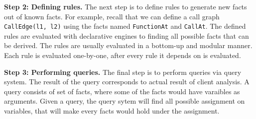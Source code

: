 \textbf{Step 2: Defining rules.}
The next step is to define rules to generate new facts out of known facts.
For example, recall that we can define a call graph
{\tt CallEdge(l1, l2)} using the facts
named {\tt FunctionAt} and {\tt CallAt}.
The defined rules are evaluated with declarative engines to finding all possible
facts that can be derived. The rules are usually evaluated in a bottom-up
and modular manner. Each rule is evaluated one-by-one, after every
rule it depends on is evaluated. 

\textbf{Step 3: Performing queries.}
The final step is to perform queries via query system.
The result of the query corresponds to actual result of client analysis.
A query consists of set of facts, where some of the facts would have
varaibles as arguments. Given a query, the query sytem will find all possible
assignment on variables, that will make every facts would hold under
the assignment.
